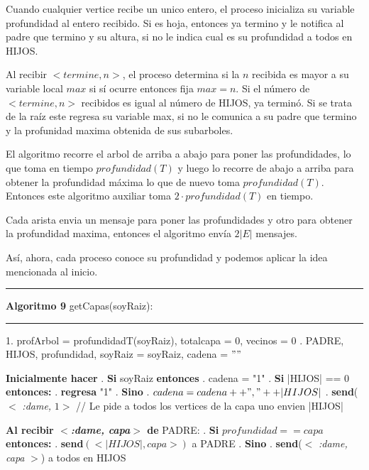 \documentclass[8pt, letterpaper]{article}
\begin{document}
\begin{enumerate}
  Cuando cualquier vertice recibe un unico entero, el proceso inicializa
  su variable profundidad al entero recibido. Si es hoja, entonces ya termino
  y le notifica al padre que termino y su altura, si no le indica cual es
  su profundidad a todos en  HIJOS.

  Al recibir $<termine, n>$, el proceso determina si la $n$ recibida es mayor
  a su variable local $max$ si sí ocurre entonces fija $max = n$.
  Si el número de $<termine, n>$
  recibidos es igual al número de HIJOS, ya terminó. Si se trata de la raíz
  este regresa su variable max, si no le comunica a su padre que termino y
  la profunidad maxima obtenida de sus subarboles.

  El algoritmo recorre el arbol de arriba a abajo para poner las profundidades,
  lo que toma en tiempo $profundidad(T)$ y luego lo recorre de abajo a arriba
  para obtener la profundidad máxima lo que de nuevo toma $profundidad(T)$.
  Entonces este algoritmo auxiliar toma $2\cdot profundidad(T)$ en tiempo.

  Cada arista envia un mensaje para poner las profundidades y otro para
  obtener la profundidad maxima, entonces el algoritmo envía $2|E|$ mensajes.
  
  \hfill\break
  Así, ahora, cada proceso conoce su profundidad y podemos aplicar la idea
  mencionada al inicio.
  \newpage
  \rule{1\textwidth}{0.2mm}
  {\bf Algoritmo 9} getCapas(soyRaiz):
  \hfill\break
  \rule{1\textwidth}{0.2mm}
  1. profArbol = profundidadT(soyRaiz), totalcapa = 0, vecinos = 0
  \hfill{}. PADRE, HIJOS, profundidad, soyRaiz = soyRaiz, cadena = $""$
  
  \hfill\break
  \hspace*{.2cm} {\bf Inicialmente hacer}
  \hfill{}. {\bf Si} soyRaiz {\bf entonces}
  \hfill{}. \hspace{0.5cm} cadena = "1"
  \hfill{}. \hspace{0.5cm} {\bf Si} |HIJOS| == 0 {\bf entonces:}
  \hfill{}. \hspace{1cm} {\bf regresa} "1"
  \hfill{}. \hspace{0.5cm} {\bf Sino}
  \hfill{}. \hspace{1cm} $cadena = cadena ++","++ |HIJOS|$
  \hfill{}. \hspace{1cm} {\bf send}($<$ {\it :dame, } $1>$ // Le pide a todos los
  vertices de la capa uno envien |HIJOS|
  \hfill\break
  
  \hspace{0.2cm} {\bf Al recibir $<${\it :dame, capa}$>$  de } PADRE:
  \hfill{}. {\bf Si} $profundidad ==  capa$ {\bf entonces:}
  \hfill{}. \hspace{.5cm} {\bf send}$(< |HIJOS|, capa>)$ a PADRE
  \hfill{}. {\bf Sino} 
  \hfill{}. \hspace{0.5cm} {\bf send}($<$ {\it :dame, capa} $>$) a todos en HIJOS
  \hfill\break


\end{enumerate}
\end{document}
